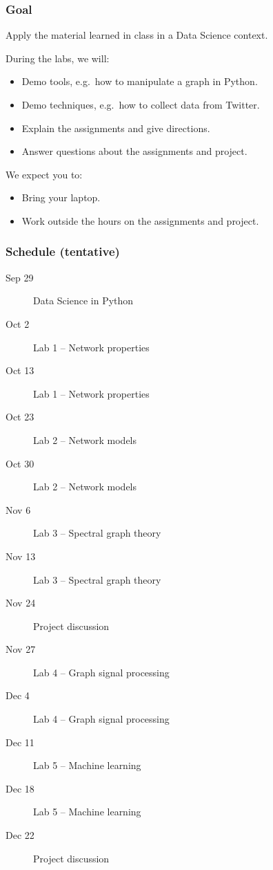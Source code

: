 \documentclass{beamer}
\begin{document}

\begin{frame}
	\frametitle{Goal}
	\begin{center}
		Apply the material learned in class in a Data Science context.
	\end{center}
	\vfill
	During the labs, we will:
	\begin{itemize}
		\item Demo tools, e.g.\ how to manipulate a graph in Python.
		\item Demo techniques, e.g.\ how to collect data from Twitter.
		\item Explain the assignments and give directions.
		\item Answer questions about the assignments and project.
	\end{itemize}
	\vfill
	We expect you to:
	\begin{itemize}
		\item Bring your laptop.
		\item Work outside the hours on the assignments and project.
	\end{itemize}
\end{frame}


\begin{frame}
	\frametitle{Schedule (tentative)}
	\begin{description}
		\item[Sep 29] Data Science in Python
		\item[Oct  2] Lab 1 -- Network properties
		\item[Oct 13] Lab 1 -- Network properties
		\item[Oct 23] Lab 2 -- Network models
		\item[Oct 30] Lab 2 -- Network models
		\item[Nov  6] Lab 3 -- Spectral graph theory
		\item[Nov 13] Lab 3 -- Spectral graph theory
		\item[Nov 24] Project discussion
		\item[Nov 27] Lab 4 -- Graph signal processing
		\item[Dec  4] Lab 4 -- Graph signal processing
		\item[Dec 11] Lab 5 -- Machine learning
		\item[Dec 18] Lab 5 -- Machine learning
		\item[Dec 22] Project discussion
	\end{description}
\end{frame}
\end{document}
